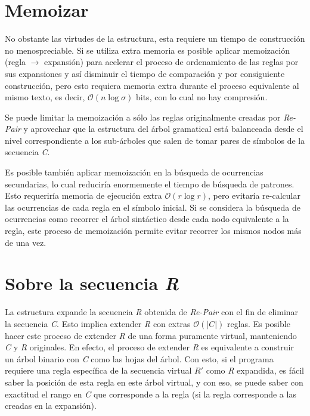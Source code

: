 \section{Memoizar}

No obstante las virtudes de la estructura, esta requiere un tiempo de construcción no menospreciable. Si se utiliza extra memoria es posible aplicar memoización (regla $\longrightarrow $ expansión) para acelerar el proceso de ordenamiento de las reglas por sus expansiones y así disminuir el tiempo de comparación y por consiguiente construcción, pero esto requiera memoria extra durante el proceso equivalente al mismo texto, es decir, $\mathcal{O}(n \log \sigma)$ bits, con lo cual no hay compresión. 

Se puede limitar la memoización a sólo las reglas originalmente creadas por \textit{Re-Pair} y aprovechar que la estructura del árbol gramatical está balanceada desde el nivel correspondiente a los sub-árboles que salen de tomar pares de símbolos de la secuencia \textit{C}.

Es posible también aplicar memoización en la búsqueda de ocurrencias secundarias, lo cual reduciría enormemente el tiempo de búsqueda de patrones. Esto requeriría memoria de ejecución extra $\mathcal{O}(r \log r)$, pero evitaría re-calcular las ocurrencias de cada regla en el símbolo inicial. Si se considera la búsqueda de ocurrencias como recorrer el árbol sintáctico desde cada nodo equivalente a la regla, este proceso de memoización permite evitar recorrer los mismos nodos más de una vez.

\section{Sobre la secuencia \textit{R}}

La estructura expande la secuencia \textit{R} obtenida de \textit{Re-Pair} con el fin de eliminar la secuencia \textit{C}. Esto implica extender \textit{R} con extras $\mathcal{O}(|C|)$ reglas. Es posible hacer este proceso de extender \textit{R} de una forma puramente virtual, manteniendo \textit{C} y \textit{R} originales. En efecto, el proceso de extender \textit{R} es equivalente a construir un árbol binario con \textit{C} como las hojas del árbol. Con esto, si el programa requiere una regla específica de la secuencia virtual $R'$ como \textit{R} expandida, es fácil saber la posición de esta regla en este árbol virtual, y con eso, se puede saber con exactitud el rango en \textit{C} que corresponde a la regla (si la regla corresponde a las creadas en la expansión). 

